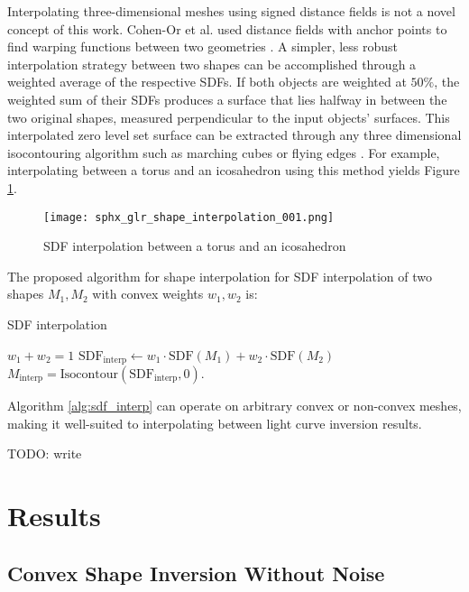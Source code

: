 Interpolating three-dimensional meshes using signed distance fields is not a novel concept of this work. Cohen-Or et al. used distance fields with anchor points to find warping functions between two geometries \cite{cohen_or1998}. A simpler, less robust interpolation strategy between two shapes can be accomplished through a weighted average of the respective SDFs. If both objects are weighted at $50\%$, the weighted sum of their SDFs produces a surface that lies halfway in between the two original shapes, measured perpendicular to the input objects' surfaces. This interpolated zero level set surface can be extracted through any three dimensional isocontouring algorithm such as marching cubes \cite{lorensen1987} or flying edges \cite{schroeder2015}. For example, interpolating between a torus and an icosahedron using this method yields Figure \ref{fig:interpolating_torus_ico}. 

\begin{figure}[!htb]
  \centering
  \texttt{[image: sphx\_glr\_shape\_interpolation\_001.png]}
  \caption{SDF interpolation between a torus and an icosahedron}
  \label{fig:interpolating_torus_ico}
\end{figure}

The proposed algorithm for shape interpolation for SDF interpolation of two shapes $M_1, M_2$ with convex weights $w_1, w_2$ is:

\begin{algorithm}
  \caption{SDF interpolation}\label{alg:sdf_interp}
  \begin{algorithmic}
  \Require $w_1 + w_2 = 1$
  \State $\mathrm{SDF}_{\textrm{interp}} \gets w_1 \cdot \mathrm{SDF}(M_1) + w_2 \cdot \mathrm{SDF}(M_2)$
  \State $M_{\textrm{interp}} = \mathrm{Isocontour}(\mathrm{SDF}_{\textrm{interp}}, 0)$.
  \end{algorithmic}
\end{algorithm}

Algorithm \ref{alg:sdf_interp} can operate on arbitrary convex or non-convex meshes, making it well-suited to interpolating between light curve inversion results.

TODO: write

\graphicspath{{/Users/liamrobinson/Documents/msthesis/static_images/aas_2022_figs}}
\chapter{Results}

\section{Convex Shape Inversion Without Noise}


